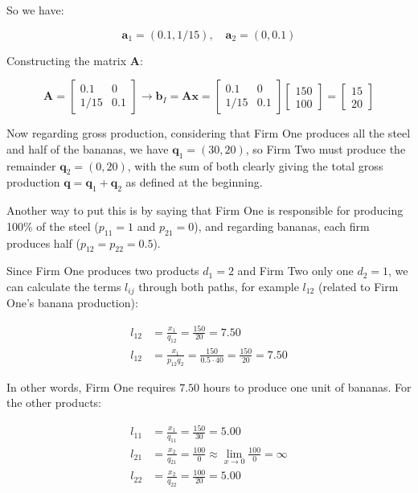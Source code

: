 So we have:

$$
\boldsymbol{a}_{1}=\left(0.1,1/15\right), \quad \boldsymbol{a}_{2}=\left(0,0.1\right)
$$

Constructing the matrix $\boldsymbol{A}$:

$$
\boldsymbol{A}=\left[\begin{array}{cc}
0.1 & 0\\
1/15 & 0.1
\end{array}\right] \rightarrow \boldsymbol{b}_{I}=\boldsymbol{A}\boldsymbol{x}=\left[\begin{array}{cc}
0.1 & 0\\
1/15 & 0.1
\end{array}\right]\left[\begin{array}{c}
150\\
100
\end{array}\right]=\left[\begin{array}{c}
15\\
20
\end{array}\right]
$$

Now regarding gross production, considering that Firm One produces all the steel and half of the bananas, we have $\boldsymbol{q}_{1}=\left(30,20\right)$, so Firm Two must produce the remainder $\boldsymbol{q}_{2}=\left(0,20\right)$, with the sum of both clearly giving the total gross production $\boldsymbol{q}=\boldsymbol{q}_{1}+\boldsymbol{q}_{2}$ as defined at the beginning.  

Another way to put this is by saying that Firm One is responsible for producing 100\% of the steel ($p_{11}=1$ and $p_{21}=0$), and regarding bananas, each firm produces half ($p_{12}=p_{22}=0.5$).  

Since Firm One produces two products $d_{1}=2$ and Firm Two only one $d_{2}=1$, we can calculate the terms $l_{ij}$ through both paths, for example $l_{12}$ (related to Firm One's banana production):


\begin{align}
l_{12} & =\frac{x_{1}}{q_{12}}=\frac{150}{20}=7.50\\
l_{12} & =\frac{x_{1}}{p_{12}q_{2}}=\frac{150}{0.5\cdot40}=\frac{150}{20}=7.50
\end{align}

In other words, Firm One requires $7.50$ hours to produce one unit of bananas. For the other products:


\begin{align}
l_{11} & =\frac{x_{1}}{q_{11}}=\frac{150}{30}=5.00\\
l_{21} & =\frac{x_{2}}{q_{21}}=\frac{100}{0}\approx\lim_{x\rightarrow0}\frac{100}{0}=\infty\\
l_{22} & =\frac{x_{2}}{q_{22}}=\frac{100}{20}=5.00
\end{align}

